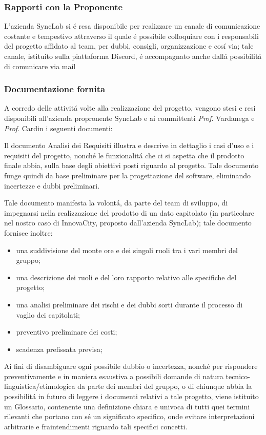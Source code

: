 \subsubsection{Rapporti con la Proponente}
L'azienda SyncLab si é resa disponibile per realizzare un canale di comunicazione costante e tempestivo attraverso il quale é possibile colloquiare con i responsabili del progetto affidato al team, per dubbi, consigli, organizzazione e cosí via; tale canale, istituito sulla piattaforma Discord, é accompagnato anche dallá possibilitá di comunicare via mail  
\subsubsection{Documentazione fornita}
A corredo delle attivitá volte alla realizzazione del progetto, vengono stesi e resi disponibili all'azienda propronente SyncLab e ai committenti \textit{Prof}. Vardanega e \textit{Prof}. Cardin i seguenti documenti:

Il documento Analisi dei Requisiti illustra e descrive in dettaglio i casi d'uso e i requisiti del progetto, nonché le funzionalitá che ci si aspetta che il prodotto finale abbia, sulla base degli obiettivi posti riguardo al progetto. Tale documento funge quindi da base preliminare per la progettazione del software, eliminando incertezze e dubbi preliminari.

Tale documento manifesta la volontá, da parte del team di sviluppo, di impegnarsi nella realizzazione del prodotto di un dato capitolato (in particolare nel nostro caso di InnovaCity, proposto dall'azienda SyncLab); tale documento fornisce inoltre:

\begin{itemize}
    \item una suddivisione del monte ore e dei singoli ruoli tra i vari membri del gruppo;
    \item una descrizione dei ruoli e del loro rapporto relativo alle specifiche del progetto;
    \item una analisi preliminare dei rischi e dei dubbi sorti durante il processo di vaglio dei capitolati;
    \item preventivo preliminare dei costi;
    \item scadenza prefissata previsa;
\end{itemize}

Ai fini di disambiguare ogni possibile dubbio o incertezza, nonché per rispondere preventivamente e in maniera esaustiva a possibili domande di natura tecnico-linguistica/etimologica da parte dei membri del gruppo, o di chiunque abbia la possibilitá in futuro di leggere i documenti relativi a tale progetto, viene istituito un Glossario, contenente una definizione chiara e univoca di tutti quei termini rilevanti che portano con sé un significato specifico, onde evitare interpretazioni arbitrarie e fraintendimenti riguardo tali specifici concetti.

